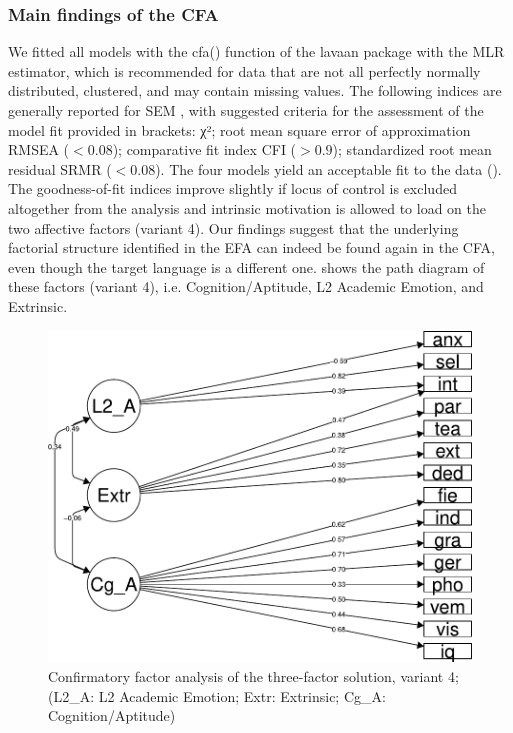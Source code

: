 \documentclass[output=paper]{langsci/langscibook}
\begin{document}
\subsubsection{Main findings of the CFA}


We fitted all models with the cfa() function of the lavaan package \citep{Rosseel2012} with the MLR estimator, which is recommended \citep{Hallquist2018} for data that are not all perfectly normally distributed, clustered, and may contain missing values. The following indices are generally reported for SEM \citep{Kline2011}, with suggested criteria for the assessment of the model fit provided in brackets: χ²; root mean square error of approximation RMSEA ($< 0.08$); comparative fit index CFI ($> 0.9$); standardized root mean residual SRMR ($< 0.08$). The four models yield an acceptable fit to the data (). The goodness-of-fit indices improve slightly if locus of control is excluded altogether from the analysis and intrinsic motivation is allowed to load on the two affective factors (variant 4). Our findings suggest that the underlying factorial structure identified in the EFA can indeed be found again in the CFA, even though the target language is a different one.  shows the path diagram of these factors (variant 4), i.e. Cognition/Aptitude, L2 Academic Emotion, and Extrinsic. 

\begin{figure}
\includegraphics[width=\textwidth]{figures/Figure3.1.pdf}
\caption{\label{fig:03:1}Confirmatory factor analysis of the three-factor solution, variant 4; (L2\_A: L2 Academic Emotion; Extr: Extrinsic; Cg\_A: Cognition/Aptitude)}
\end{figure}
\end{document}
